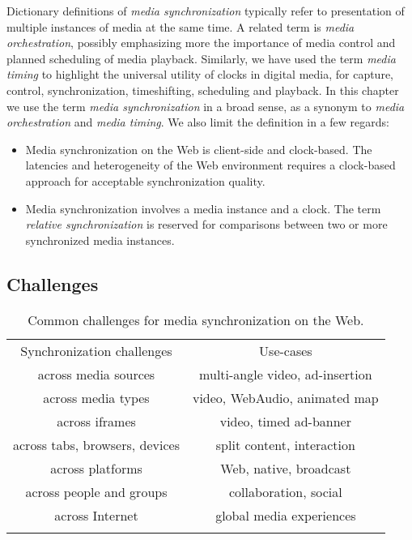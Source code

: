 Dictionary definitions of \emph{media synchronization} typically refer to
presentation of multiple instances of media at the same time. A related term
is \emph{media orchestration}, possibly emphasizing more the importance of
media control and planned scheduling of media playback. Similarly, we have
used the term \emph{media timing} to highlight the universal utility of clocks
in digital media, for capture, control, synchronization, timeshifting,
scheduling and playback. In this chapter we use the term \emph{media
synchronization} in a broad sense, as a synonym to \emph{media orchestration}
and \emph{media timing}. We also limit the definition in a few regards:

\begin{itemize}
\item{Media synchronization on the Web is client-side and clock-based. The latencies and heterogeneity of the Web environment requires a clock-based approach for acceptable synchronization quality.}
\item{Media synchronization involves a media instance and a clock. The term \emph{relative synchronization} is reserved for comparisons between two or more synchronized media instances.}
\end{itemize}

\subsection{Challenges}


\begin{table}
\centering
\caption{Common challenges for media synchronization on the Web.}
\label{tab:challenges}
\setlength{\tabcolsep}{10pt}
\begin{tabular}{cc}
\hline\noalign{\smallskip}
Synchronization challenges & Use-cases \\
\noalign{\smallskip}\svhline\noalign{\smallskip}
across media sources & multi-angle video, ad-insertion \\
across media types & video, WebAudio, animated map \\
across iframes & video, timed ad-banner \\
across tabs, browsers, devices & split content, interaction \\
across platforms & Web, native, broadcast \\
across people and groups & collaboration, social \\
across Internet & global media experiences \\
\noalign{\smallskip}\hline\noalign{\smallskip}
\end{tabular}
\end{table} 



